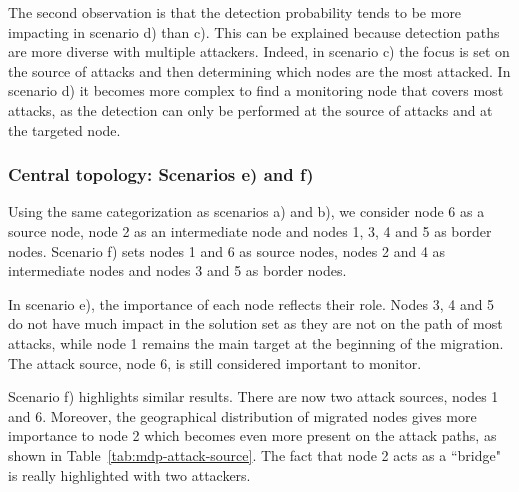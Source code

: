 The second observation is that the detection probability tends to be more impacting in scenario d) than c). This can be explained because detection paths are more diverse with multiple attackers. Indeed, in scenario c) the focus is set on the source of attacks and then determining which nodes are the most attacked.
In scenario d) it becomes more complex to find a monitoring node that covers most attacks, as the detection can only be performed at the source of attacks and at the targeted node.



\subsubsection*{Central topology: Scenarios e) and f)}
Using the same categorization as scenarios a) and b), we consider node 6 as a source node, node 2 as an intermediate node and nodes 1, 3, 4 and 5 as border nodes. 
Scenario f) sets nodes 1 and 6 as source nodes, nodes 2 and 4 as intermediate nodes and nodes  3 and 5 as border nodes.

In scenario e), the importance of each node reflects their role. Nodes 3, 4 and 5 do not have much impact in the solution set as they are not on the path of most attacks, while node 1 remains the main target at the beginning of the migration. The attack source, node 6, is still considered important to monitor.

Scenario f) highlights similar results. There are now two attack sources, nodes 1 and 6. Moreover, the geographical distribution of migrated nodes gives more importance to node 2 which becomes even more present on the attack paths, as shown in Table~\ref{tab:mdp-attack-source}. The fact that node 2 acts as a ``bridge" is really highlighted with two attackers.


